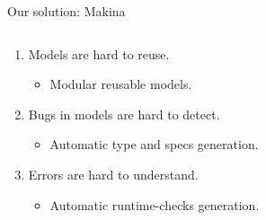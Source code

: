 \documentclass[aspectratio=169, 10pt]{beamer}
\begin{document}
\begin{frame}[label={sec:orgbf094da}]{Our solution: Makina}
\begin{columns}
\begin{column}{0.48\columnwidth}
\begin{enumerate}
\item Models are hard to reuse.
\begin{itemize}
\item Modular reusable models. \vspace{10pt}
\end{itemize}
\item Bugs in models are hard to detect.
\begin{itemize}
\item Automatic type and specs generation. \vspace{10pt}
\end{itemize}
\item Errors are hard to understand.
\begin{itemize}
\item Automatic runtime-checks generation. \vspace{10pt}
\end{itemize}
\end{enumerate}
\end{column}
\end{columns}
\end{frame}
\end{document}
